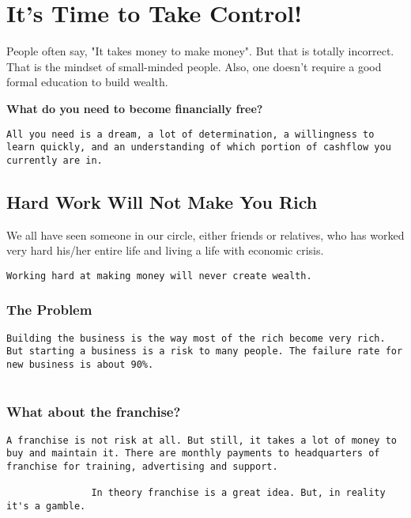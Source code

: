 \documentclass[a4paper, 12pt]{report}
\begin{document}
    \chapter{It's Time to Take Control!}
    
    People often say, "It takes money to make money". But that is totally incorrect. That is the mindset of small-minded people. Also, one doesn't require a good formal education to build wealth.
     \begin{framedquest*}
       \textbf{What do you need to become financially free?}
    \end{framedquest*}
    \begin{lstlisting}[style=latexFrameTB]
               All you need is a dream, a lot of determination, a willingness to learn quickly, and an understanding of which portion of cashflow you currently are in.
    \end{lstlisting}
    \section{Hard Work Will Not Make You Rich}
    We all have seen someone in our circle, either friends or relatives, who has worked very hard his/her entire life and living a life with economic crisis.
    \begin{lstlisting}[style=latexFrameTB]
               Working hard at making money will never create wealth.
    \end{lstlisting}
    \subsection{The Problem}
    \begin{lstlisting}[style=latexFrameTB]
               Building the business is the way most of the rich become very rich. But starting a business is a risk to many people. The failure rate for new business is about 90%.
               
    \end{lstlisting}
    \subsection{What about the franchise?}
    \begin{lstlisting}[style=latexFrameTB]
               A franchise is not risk at all. But still, it takes a lot of money to buy and maintain it. There are monthly payments to headquarters of franchise for training, advertising and support.
               
               In theory franchise is a great idea. But, in reality it's a gamble.
    \end{lstlisting}
    
\end{document}
